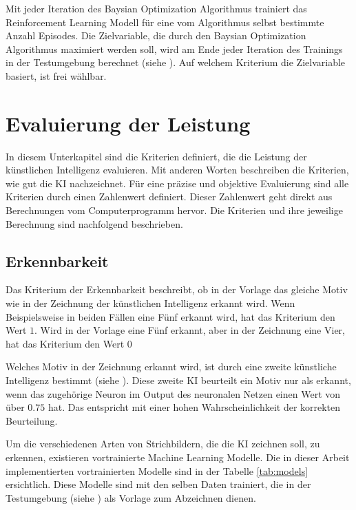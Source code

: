 Mit jeder Iteration des Baysian Optimization Algorithmus trainiert das
Reinforcement Learning Modell für eine vom Algorithmus selbst bestimmte Anzahl
Episodes. Die Zielvariable, die durch den Baysian Optimization Algorithmus
maximiert werden soll, wird am Ende jeder Iteration des Trainings in der
Testumgebung berechnet (siehe ). Auf welchem
Kriterium die Zielvariable basiert, ist frei wählbar.



\section{Evaluierung der Leistung}\label{chap:m_eval}
In diesem Unterkapitel sind die Kriterien definiert, die die Leistung der
künstlichen Intelligenz evaluieren. Mit anderen Worten beschreiben die
Kriterien, wie gut die KI nachzeichnet. Für eine präzise und objektive
Evaluierung sind alle Kriterien durch einen Zahlenwert definiert. Dieser
Zahlenwert geht direkt aus Berechnungen vom Computerprogramm hervor. Die
Kriterien und ihre jeweilige Berechnung sind nachfolgend beschrieben.

\subsection{Erkennbarkeit}\label{sub:m_eval_rec}
Das Kriterium der Erkennbarkeit beschreibt, ob in der Vorlage das gleiche Motiv
wie in der Zeichnung der künstlichen Intelligenz erkannt wird. Wenn
Beispielsweise in beiden Fällen eine Fünf erkannt wird, hat das Kriterium den
Wert $1$. Wird in der Vorlage eine Fünf erkannt, aber in der Zeichnung eine
Vier, hat das Kriterium den Wert $0$

Welches Motiv in der Zeichnung erkannt wird, ist durch eine zweite künstliche
Intelligenz bestimmt (siehe ). Diese zweite KI beurteilt
ein Motiv nur als erkannt, wenn das zugehörige Neuron im Output des neuronalen
Netzen einen Wert von über $0.75$ hat. Das entspricht mit einer hohen
Wahrscheinlichkeit der korrekten Beurteilung.

Um die verschiedenen Arten von Strichbildern, die die KI zeichnen soll, zu
erkennen, existieren vortrainierte Machine Learning Modelle. Die in dieser
Arbeit implementierten vortrainierten Modelle sind in der Tabelle \autoref{tab:models}
ersichtlich. Diese Modelle sind mit den selben Daten trainiert, die in der
Testumgebung (siehe ) als Vorlage zum Abzeichnen
dienen.

